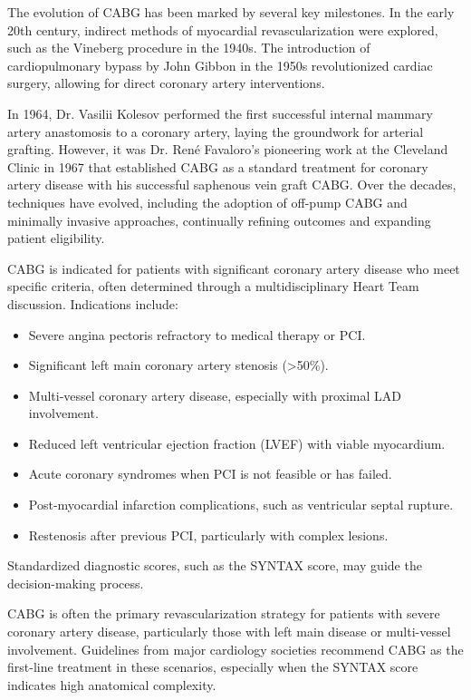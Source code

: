 The evolution of CABG has been marked by several key milestones. In the early 20th century, indirect methods of myocardial revascularization were explored, such as the Vineberg procedure in the 1940s. The introduction of cardiopulmonary bypass by John Gibbon in the 1950s revolutionized cardiac surgery, allowing for direct coronary artery interventions.

In 1964, Dr. Vasilii Kolesov performed the first successful internal mammary artery anastomosis to a coronary artery, laying the groundwork for arterial grafting. However, it was Dr. René Favaloro's pioneering work at the Cleveland Clinic in 1967 that established CABG as a standard treatment for coronary artery disease with his successful saphenous vein graft CABG. Over the decades, techniques have evolved, including the adoption of off-pump CABG and minimally invasive approaches, continually refining outcomes and expanding patient eligibility.

CABG is indicated for patients with significant coronary artery disease who meet specific criteria, often determined through a multidisciplinary Heart Team discussion. Indications include:

\begin{itemize}
  \item Severe angina pectoris refractory to medical therapy or PCI.
  \item Significant left main coronary artery stenosis (>50\%).
  \item Multi-vessel coronary artery disease, especially with proximal LAD involvement.
  \item Reduced left ventricular ejection fraction (LVEF) with viable myocardium.
  \item Acute coronary syndromes when PCI is not feasible or has failed.
  \item Post-myocardial infarction complications, such as ventricular septal rupture.
  \item Restenosis after previous PCI, particularly with complex lesions.
\end{itemize}

Standardized diagnostic scores, such as the SYNTAX score, may guide the decision-making process.

CABG is often the primary revascularization strategy for patients with severe coronary artery disease, particularly those with left main disease or multi-vessel involvement. Guidelines from major cardiology societies recommend CABG as the first-line treatment in these scenarios, especially when the SYNTAX score indicates high anatomical complexity.

